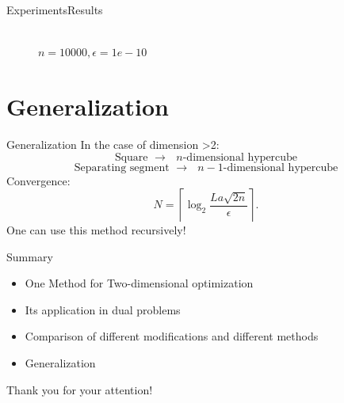\documentclass{beamer}
\begin{document}
\begin{frame}{Experiments}{Results}
\begin{figure}[H]
\begin{minipage}[h]{0.47\linewidth}
\end{minipage}
\hfill
\begin{minipage}[h]{0.47\linewidth}
 \\$n=10000, \epsilon=1e-10$ \\
\end{minipage}
\end{figure}
\end{frame}

\section{Generalization}

\begin{frame}{Generalization}
In the case of dimension >2:
$$\text{Square $\rightarrow$ $n$-dimensional hypercube}$$
$$\text{Separating segment $\rightarrow$ $n-1$-dimensional hypercube}$$
\pause
Convergence:
\begin{equation}N = \left\lceil\log_2\frac{La\sqrt{2n}}{\epsilon}\right\rceil.\end{equation}
\pause
One can use this method recursively!
\end{frame}

\begin{frame}{Summary}
\begin{itemize}
\item One Method for Two-dimensional optimization
\item Its application in dual problems
\item Comparison of different modifications and different methods
\item Generalization
\end{itemize}
\end{frame}


\begin{frame}
\center Thank you for your attention!
\end{frame}
\end{document}
